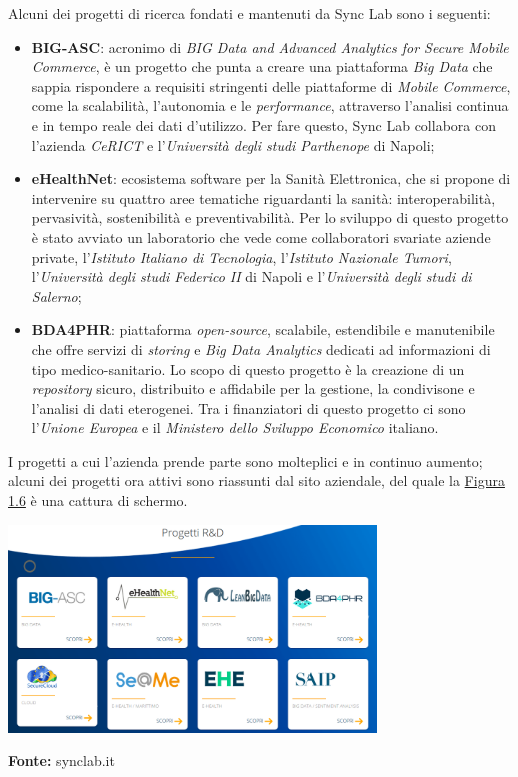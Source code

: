 Alcuni dei progetti di ricerca fondati e mantenuti da Sync Lab sono i seguenti:
\begin{itemize}
  \item \textbf{BIG-ASC}: acronimo di \textit{BIG Data and Advanced Analytics for Secure Mobile Commerce}, è un progetto che punta a creare una piattaforma \textit{Big Data} che sappia rispondere a requisiti stringenti delle piattaforme di \textit{Mobile Commerce}, come la scalabilità, l'autonomia e le \textit{performance}, attraverso l'analisi continua e in tempo reale dei dati d'utilizzo. Per fare questo, Sync Lab collabora con l'azienda \textit{CeRICT} e l'\textit{Università degli studi Parthenope} di Napoli;
  \item \textbf{eHealthNet}: ecosistema software per la Sanità Elettronica, che si propone di intervenire su quattro aree tematiche riguardanti la sanità: interoperabilità, pervasività, sostenibilità e preventivabilità. Per lo sviluppo di questo progetto è stato avviato un laboratorio che vede come collaboratori svariate aziende private, l'\textit{Istituto Italiano di Tecnologia}, l'\textit{Istituto Nazionale Tumori}, l'\textit{Università degli studi Federico II} di Napoli e l'\textit{Università degli studi di Salerno};
  \item \textbf{BDA4PHR}: piattaforma \textit{open-source}, scalabile, estendibile e manutenibile che offre servizi di \textit{storing} e \textit{Big Data Analytics} dedicati ad informazioni di tipo medico-sanitario. Lo scopo di questo progetto è la creazione di un \textit{repository} sicuro, distribuito e affidabile per la gestione, la condivisone e l'analisi di dati eterogenei. Tra i finanziatori di questo progetto ci sono l'\textit{Unione Europea} e il \textit{Ministero dello Sviluppo Economico} italiano. \\
\end{itemize}

I progetti a cui l'azienda prende parte sono molteplici e in continuo aumento; alcuni dei progetti ora attivi sono riassunti dal sito aziendale, del quale la \hyperref[img:progetti]{Figura 1.6} è una cattura di schermo. \\

\begin{minipage}{\linewidth}
  \label{img:progetti}
  \centering
    \includegraphics[height=5.5cm]{immagini/progetti}
  \caption*{\textbf{Fonte:} synclab.it}
\end{minipage} \\

